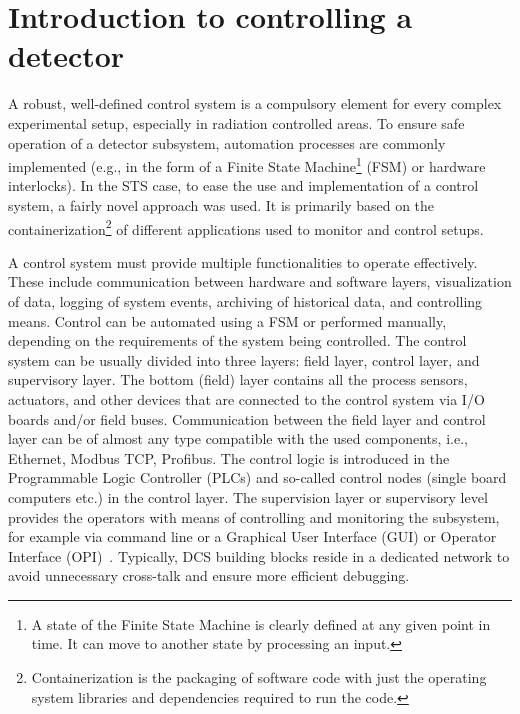 \section{Introduction to controlling a detector}
A robust, well-defined control system is a compulsory element for every complex experimental setup, especially in radiation controlled areas. To ensure safe operation of a detector subsystem, automation processes are commonly implemented (e.g., in the form of a Finite State Machine\footnote{A state of the Finite State Machine is clearly defined at any given point in time. It can move to another state by processing an input.} (\gls{FSM}) or hardware interlocks). In the \gls{STS} case, to ease the use and implementation of a control system, a fairly novel approach was used. It is primarily based on the containerization\footnote{Containerization is the packaging of software code with just the operating system libraries and dependencies required to run the code.} of different applications used to monitor and control setups. 




A control system must provide multiple functionalities to operate effectively. These include communication between hardware and software layers, visualization of data, logging of system events, archiving of historical data, and controlling means. Control can be automated using a \gls{FSM} or performed manually, depending on the requirements of the system being controlled. The control system can be usually divided into three layers: field layer, control layer, and supervisory layer. The bottom (field) layer contains all the process sensors, actuators, and other devices that are connected to the control system via I/O boards and/or field buses. Communication between the field layer and control layer can be of almost any type compatible with the used components, i.e., Ethernet, Modbus \gls{TCP}, Profibus. The control logic is introduced in the Programmable Logic Controller (\glspl{PLC}) and so-called control nodes (single board computers etc.) in the control layer. The supervision layer or supervisory level provides the operators with means of controlling and monitoring the subsystem, for example via command line or a Graphical User Interface (\gls{GUI}) or Operator Interface (\gls{OPI})~\cite{layers}.  Typically, DCS building blocks reside in a dedicated network to avoid unnecessary cross-talk and ensure more efficient debugging.

